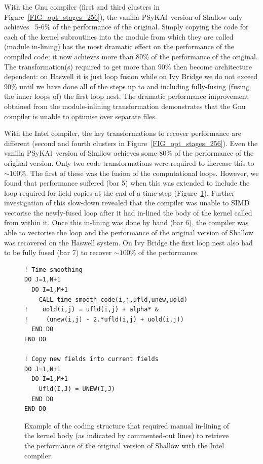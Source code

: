 \documentclass{IOS-Book-Article}
\newcommand{\psykal}{{PS}y{KA}l}
\begin{document}
With the Gnu compiler (first and third clusters in
Figure~\ref{FIG_opt_stages_256}), the vanilla \psykal\ version of
Shallow only achieves ~5-6\% of the performance of the
original. Simply copying the code for each of the kernel subroutines
into the module from which they are called (module in-lining) has the
most dramatic effect on the performance of the compiled code; it now
achieves more than 80\% of the performance of the original. The
transformation(s) required to get more than 90\% then become
architecture dependent: on Haswell it is just loop fusion while on Ivy
Bridge we do not exceed 90\% until we have done all of the steps up to
and including fully-fusing (fusing the inner loops of) the first loop
nest. The dramatic performance improvement obtained from the
module-inlining transformation demonstrates that the Gnu compiler is
unable to optimise over separate files.

With the Intel compiler, the key transformations to recover
performance are different (second and fourth clusters in
Figure~\ref{FIG_opt_stages_256}).  Even the vanilla \psykal\ version of
Shallow achieves some 80\% of the performance of the original
version. Only two code transformations were required to increase this
to $\sim$100\%. The first of these was the fusion of the computational
loops. However, we found that performance suffered (bar 5) when this
was extended to include the loop required for field copies at the end
of a time-step (Figure~\ref{FIG_time_smooth_code}). Further
investigation of this slow-down revealed that the compiler was unable
to SIMD vectorise the newly-fused loop after it had in-lined the body
of the kernel called from within it. Once this in-lining was done by
hand (bar 6), the compiler was able to vectorise the loop and the
performance of the original version of Shallow was recovered on the
Haswell system. On Ivy Bridge the first loop nest also had to be fully
fused (bar 7) to recover $\sim100\%$ of the performance.

\begin{figure}
\begin{verbatim}
! Time smoothing
DO J=1,N+1
  DO I=1,M+1
    CALL time_smooth_code(i,j,ufld,unew,uold)
!    uold(i,j) = ufld(i,j) + alpha* &
!     (unew(i,j) - 2.*ufld(i,j) + uold(i,j))
  END DO
END DO

! Copy new fields into current fields
DO J=1,N+1
  DO I=1,M+1
    Ufld(I,J) = UNEW(I,J)
  END DO
END DO
\end{verbatim}
\caption{Example of the coding structure that required manual
  in-lining of the kernel body (as indicated by commented-out lines)
  to retrieve the performance of the original version of Shallow with
  the Intel compiler.}
\label{FIG_time_smooth_code}
\end{figure}
\end{document}
